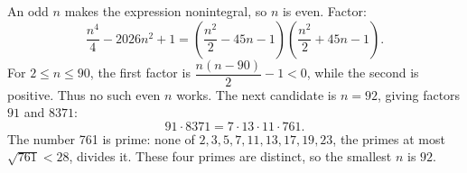 An odd $n$ makes the expression nonintegral, so $n$ is even. Factor:
\[\dfrac{n^4}{4}-2026n^2+1=
\left(\dfrac{n^2}{2}-45n-1\right)
\left(\dfrac{n^2}{2}+45n-1\right).\]
For $2\le n\le90$, the first factor is $\dfrac{n(n-90)}{2}-1<0$, while the second is positive. Thus no such even $n$ works. The next candidate is $n=92$, giving factors $91$ and $8371$:
\[91\cdot8371=7\cdot13\cdot11\cdot761.\]
The number 761 is prime: none of $2,3,5,7,11,13,17,19,23$, the primes at most $\sqrt{761}<28$, divides it. These four primes are distinct, so the smallest $n$ is $\boxed{92}$.
